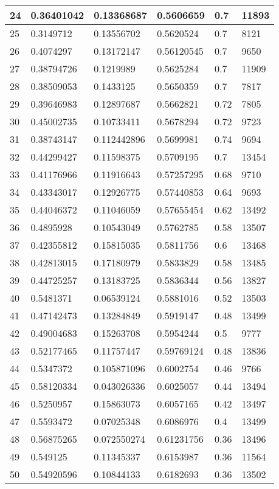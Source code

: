 \begin{longtable}{|l|l|l|l|l|l|}
24 & 0.36401042 & 0.13368687 & 0.5606659 & 0.7 & 11893 \\ \hline 
25 & 0.3149712 & 0.13556702 & 0.5620524 & 0.7 & 8121 \\ \hline 
26 & 0.4074297 & 0.13172147 & 0.56120545 & 0.7 & 9650 \\ \hline 
27 & 0.38794726 & 0.1219989 & 0.5625284 & 0.7 & 11909 \\ \hline 
28 & 0.38509053 & 0.1433125 & 0.5650359 & 0.7 & 7817 \\ \hline 
29 & 0.39646983 & 0.12897687 & 0.5662821 & 0.72 & 7805 \\ \hline 
30 & 0.45002735 & 0.10733411 & 0.5678294 & 0.72 & 9723 \\ \hline 
31 & 0.38743147 & 0.112442896 & 0.5699981 & 0.74 & 9694 \\ \hline 
32 & 0.44299427 & 0.11598375 & 0.5709195 & 0.7 & 13454 \\ \hline 
33 & 0.41176966 & 0.11916643 & 0.57257295 & 0.68 & 9710 \\ \hline 
34 & 0.43343017 & 0.12926775 & 0.57440853 & 0.64 & 9693 \\ \hline 
35 & 0.44046372 & 0.11046059 & 0.57655454 & 0.62 & 13492 \\ \hline 
36 & 0.4895928 & 0.10543049 & 0.5762785 & 0.58 & 13507 \\ \hline 
37 & 0.42355812 & 0.15815035 & 0.5811756 & 0.6 & 13468 \\ \hline 
38 & 0.42813015 & 0.17180979 & 0.5833829 & 0.58 & 13485 \\ \hline 
39 & 0.44725257 & 0.13183725 & 0.5836344 & 0.56 & 13827 \\ \hline 
40 & 0.5481371 & 0.06539124 & 0.5881016 & 0.52 & 13503 \\ \hline 
41 & 0.47142473 & 0.13284849 & 0.5919147 & 0.48 & 13499 \\ \hline 
42 & 0.49004683 & 0.15263708 & 0.5954244 & 0.5 & 9777 \\ \hline 
43 & 0.52177465 & 0.11757447 & 0.59769124 & 0.48 & 13836 \\ \hline 
44 & 0.5347372 & 0.105871096 & 0.6002754 & 0.46 & 9766 \\ \hline 
45 & 0.58120334 & 0.043026336 & 0.6025057 & 0.44 & 13494 \\ \hline 
46 & 0.5250957 & 0.15863073 & 0.6057165 & 0.42 & 13497 \\ \hline 
47 & 0.5593472 & 0.07025348 & 0.6086976 & 0.4 & 13499 \\ \hline 
48 & 0.56875265 & 0.072550274 & 0.61231756 & 0.36 & 13496 \\ \hline 
49 & 0.549125 & 0.11345337 & 0.6153987 & 0.36 & 11564 \\ \hline 
50 & 0.54920596 & 0.10844133 & 0.6182693 & 0.36 & 13502 \\ \hline 
\end{longtable}